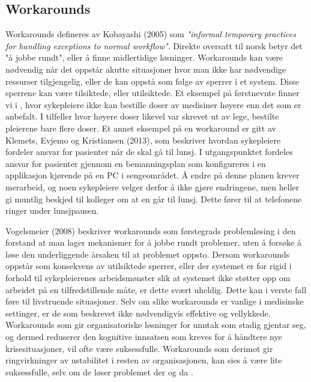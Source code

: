 \subsection{Workarounds}
\label{chp: workarounds}

Workarounds defineres av Kobayashi (2005) som \emph{"informal temporary practices for handling exceptions to normal workflow"}. Direkte oversatt til norsk betyr det "å jobbe rundt", eller å finne midlertidige løsninger.
\noindent
Workarounds kan være nødvendig når det oppstår akutte situasjoner hvor man ikke har nødvendige ressurser tilgjengelig, eller de kan oppstå som følge av sperrer i et system. Disse sperrene kan være tilsiktede, eller utilsiktede. Et eksempel på førstnevnte finner vi i \cite{Vogelsmeier08}, hvor sykepleiere ikke kan bestille doser av medisiner høyere enn det som er anbefalt. I tilfeller hvor høyere doser likevel var skrevet ut av lege, bestilte pleierene bare flere doser. 
Et annet eksempel på en workaround er gitt av Klemets, Evjemo og Kristiansen (2013), som beskriver hvordan sykepleiere fordeler ansvar for pasienter når de skal gå til lunsj. I utgangspunktet fordeles ansvar for pasienter gjennom en bemanningsplan som konfigureres i en applikasjon kjørende på en PC i sengeområdet. Å endre på denne planen krever merarbeid, og noen sykepleiere velger derfor å ikke gjøre endringene, men heller gi muntlig beskjed til kolleger om at en går til lunsj. Dette fører til at telefonene ringer under lunsjpausen.

\noindent
Vogelsmeier (2008) beskriver workarounds som førstegrads problemløsing i den forstand at man lager mekanismer for å jobbe rundt problemer, uten å forsøke å løse den underliggende årsaken til at problemet oppsto.
Dersom workarounds oppstår som konsekvens av utilsiktede sperrer, eller der systemet er for rigid i forhold til sykepleierenes arbeidsmønster slik at systemet ikke støtter opp om arbeidet på en tilfredstillende måte, er dette svært uheldig. Dette kan i verste fall føre til livstruende situasjoner.
Selv om slike workarounds er vanlige i medisinske settinger, er de som beskrevet ikke nødvendigvis effektive og vellykkede. Workarounds som gir organisatoriske løsninger for unntak som stadig gjentar seg, og dermed reduserer den kognitive innsatsen som kreves for å håndtere nye krisesituasjoner, vil ofte være suksessfulle. Workarounds som derimot gir ringvirkninger av ustabilitet i resten av organisasjonen, kan sies å være lite suksessfulle, selv om de løser problemet der og da \cite{Kobayashi05}.